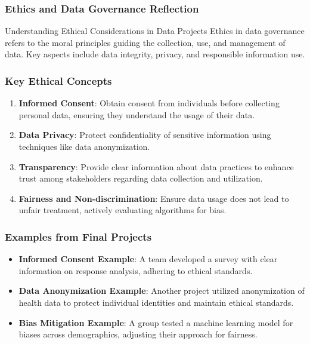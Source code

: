 \documentclass[aspectratio=169]{beamer}
\begin{document}
\begin{frame}[fragile]
    \frametitle{Ethics and Data Governance Reflection}
    
    \begin{block}{Understanding Ethical Considerations in Data Projects}
        Ethics in data governance refers to the moral principles guiding the collection, use, and management of data. Key aspects include data integrity, privacy, and responsible information use.
    \end{block}
\end{frame}

\begin{frame}[fragile]
    \frametitle{Key Ethical Concepts}
    
    \begin{enumerate}
        \item \textbf{Informed Consent}: Obtain consent from individuals before collecting personal data, ensuring they understand the usage of their data.
        \item \textbf{Data Privacy}: Protect confidentiality of sensitive information using techniques like data anonymization.
        \item \textbf{Transparency}: Provide clear information about data practices to enhance trust among stakeholders regarding data collection and utilization.
        \item \textbf{Fairness and Non-discrimination}: Ensure data usage does not lead to unfair treatment, actively evaluating algorithms for bias.
    \end{enumerate}
\end{frame}

\begin{frame}[fragile]
    \frametitle{Examples from Final Projects}
    
    \begin{itemize}
        \item \textbf{Informed Consent Example}: A team developed a survey with clear information on response analysis, adhering to ethical standards.
        
        \item \textbf{Data Anonymization Example}: Another project utilized anonymization of health data to protect individual identities and maintain ethical standards.
        
        \item \textbf{Bias Mitigation Example}: A group tested a machine learning model for biases across demographics, adjusting their approach for fairness.
    \end{itemize}
\end{frame}
\end{document}
